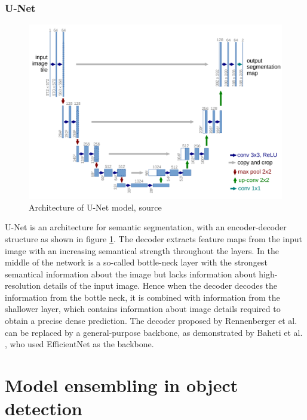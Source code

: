 \subsubsection{U-Net}
\begin{figure}
    \centering
    \includegraphics[width=\linewidth]{images/U-Net.png}
    \caption{Architecture of U-Net model, source \cite{Ronneberger2015}}
    \label{fig:unet_architecture}
\end{figure}
U-Net is an architecture for semantic segmentation, with an encoder-decoder structure as shown in figure \ref{fig:unet_architecture}. The decoder extracts feature maps from the input image with an increasing semantical strength throughout the layers. In the middle of the network is a so-called bottle-neck layer with the strongest semantical information about the image but lacks information about high-resolution details of the input image. Hence when the decoder decodes the information from the bottle neck, it is combined with information from the shallower layer, which contains information about image details required to obtain a precise dense prediction.
\newline
The decoder proposed by Rennenberger et al. \cite{Ronneberger2015} can be replaced by a general-purpose backbone, as demonstrated by Baheti et al. \cite{Baheti2020}, who used EfficientNet as the backbone.

\section{Model ensembling in object detection}
\label{sec:model_ensembling}

